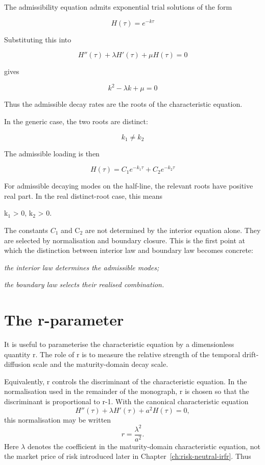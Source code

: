 \documentclass[11pt,oneside]{book}
\begin{document}
The admissibility equation admits exponential trial solutions of the
form

\[
H(\tau) = e^{-k\tau}
\]

Substituting this into

\[
H''(\tau) + \lambda H'(\tau) + \mu H(\tau) = 0
\]

gives

\[
k^2 - \lambda k + \mu = 0
\]

Thus the admissible decay rates are the roots of the characteristic
equation.

In the generic case, the two roots are distinct:

\[
k_1 \neq k_2
\]

The admissible loading is then

\[
H(\tau) = C_1e^{-k_1\tau} + C_2e^{-k_2\tau}
\]

For admissible decaying modes on the half-line, the relevant roots have
positive real part. In the real distinct-root case, this means

k$_1$ \textgreater{} 0, k$_2$ \textgreater{} 0.

The constants $C_1$ and C$_2$ are not determined by the interior equation
alone. They are selected by normalisation and boundary closure. This is
the first point at which the distinction between interior law and
boundary law becomes concrete:

\begin{center}\emph{the interior law determines the admissible modes;}\end{center}
\begin{center}\emph{the boundary law selects their realised combination.}\end{center}
\section{The r-parameter}\label{the-r-parameter}

It is useful to parameterise the characteristic equation by a
dimensionless quantity r. The role of r is to measure the relative
strength of the temporal drift-diffusion scale and the maturity-domain
decay scale.

Equivalently, r controls the discriminant of the characteristic
equation. In the normalisation used in the remainder of the monograph, r
is chosen so that the discriminant is proportional to r-1. With the
canonical characteristic equation
\[
H''(\tau)+\lambda H'(\tau)+a^2H(\tau)=0,
\]
this normalisation may be written
\[
r=\frac{\lambda^2}{a^2}.
\]
Here \(\lambda\) denotes the coefficient in the maturity-domain characteristic equation, not the market price of risk introduced later in Chapter~\ref{ch:risk-neutral-irfr}. Thus
\end{document}
